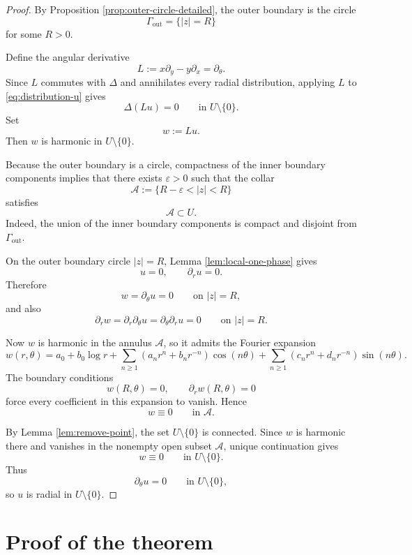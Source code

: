 \documentclass[11pt]{amsart}
\theoremstyle{remark}
\newcommand{\1}{\mathbf 1}
\begin{document}
\begin{proof}
By Proposition \ref{prop:outer-circle-detailed}, the outer boundary is the circle
\[
\Gamma_{\mathrm{out}}=\{|z|=R\}
\]
for some $R>0$.

Define the angular derivative
\[
L:=x\partial_y-y\partial_x=\partial_\theta.
\]
Since $L$ commutes with $\Delta$ and annihilates every radial distribution, applying $L$ to \eqref{eq:distribution-u} gives
\[
\Delta (Lu)=0
\qquad\text{in }U\setminus\{0\}.
\]
Set
\[
w:=Lu.
\]
Then $w$ is harmonic in $U\setminus\{0\}$.

Because the outer boundary is a circle, compactness of the inner boundary components implies that there exists $\varepsilon>0$ such that the collar
\[
\mathcal A:=\{R-\varepsilon<|z|<R\}
\]
satisfies
\[
\mathcal A\subset U.
\]
Indeed, the union of the inner boundary components is compact and disjoint from $\Gamma_{\mathrm{out}}$.

On the outer boundary circle $|z|=R$, Lemma \ref{lem:local-one-phase} gives
\[
u=0,\qquad \partial_r u=0.
\]
Therefore
\[
w=\partial_\theta u=0
\qquad\text{on }|z|=R,
\]
and also
\[
\partial_r w=\partial_r\partial_\theta u=\partial_\theta\partial_r u=0
\qquad\text{on }|z|=R.
\]

Now $w$ is harmonic in the annulus $\mathcal A$, so it admits the Fourier expansion
\[
w(r,\theta)
=
a_0+b_0\log r
+\sum_{n\ge 1}(a_n r^n+b_n r^{-n})\cos(n\theta)
+\sum_{n\ge 1}(c_n r^n+d_n r^{-n})\sin(n\theta).
\]
The boundary conditions
\[
w(R,\theta)=0,\qquad \partial_r w(R,\theta)=0
\]
force every coefficient in this expansion to vanish. Hence
\[
w\equiv 0
\qquad\text{in }\mathcal A.
\]

By Lemma \ref{lem:remove-point}, the set $U\setminus\{0\}$ is connected. Since $w$ is harmonic there and vanishes in the nonempty open subset $\mathcal A$, unique continuation gives
\[
w\equiv 0
\qquad\text{in }U\setminus\{0\}.
\]
Thus
\[
\partial_\theta u=0
\qquad\text{in }U\setminus\{0\},
\]
so $u$ is radial in $U\setminus\{0\}$.
\end{proof}

\section{Proof of the theorem}
\end{document}
